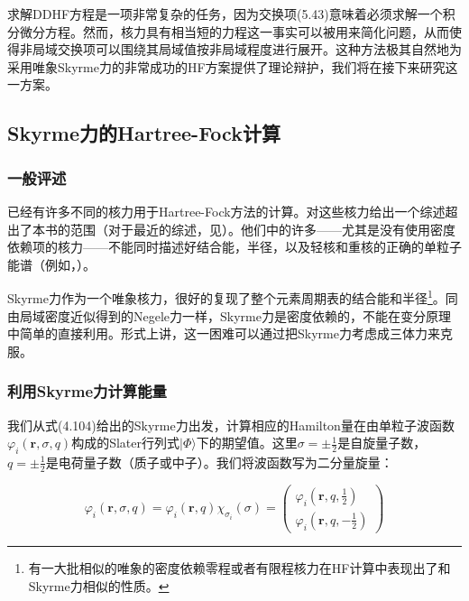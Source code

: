 求解DDHF方程是一项非常复杂的任务，因为交换项(5.43)意味着必须求解一个积分微分方程。然而，核力具有相当短的力程这一事实可以被用来简化问题，从而使得非局域交换项可以围绕其局域值按非局域程度进行展开。这种方法极其自然地为采用唯象Skyrme力的非常成功的HF方案提供了理论辩护，我们将在接下来研究这一方案\cite{Ne75}。

\subsection{Skyrme力的Hartree-Fock计算\label{subsec:Skyrme=00529B=007684Hartree-Fock=008BA1=007B97}}

\subsubsection{一般评述\label{subsubsec:=004E00=00822C=008BC4=008FF0}}

已经有许多不同的核力用于Hartree-Fock方法的计算。对这些核力给出一个综述超出了本书的范围（对于最近的综述，见\cite{QF78}）。他们中的许多——尤其是没有使用密度依赖项的核力——不能同时描述好结合能，半径，以及轻核和重核的正确的单粒子能谱（例如，\cite{Vo65,MB65,BB67,NDK68,PS68,SFW69,SP70}）。

Skyrme力作为一个唯象核力，很好的复现了整个元素周期表的结合能和半径\footnote{有一大批相似的唯象的密度依赖零程\cite{Mo70,LV71,La72,EM72,BJS75,Ko76,LB76,TK76,KKS77,SM78}或者有限程\cite{Kr70,ZR71,RPS72,LMV73,Go75b,RBP77}核力在HF计算中表现出了和Skyrme力相似的性质。}。同由局域密度近似得到的Negele力一样，Skyrme力是密度依赖的，不能在变分原理中简单的直接利用。形式上讲，这一困难可以通过把Skyrme力考虑成三体力来克服。

\subsubsection{利用Skyrme力计算能量\label{subsubsec:=005229=007528Skyrme=00529B=008BA1=007B97=0080FD=0091CF}}

我们从式(4.104)给出的Skyrme力出发，计算相应的Hamilton量在由单粒子波函数$\varphi_{i}(\boldsymbol{r},\sigma,q)$构成的Slater行列式$|\Phi\rangle$下的期望值。这里$\sigma=\pm\frac{1}{2}$是自旋量子数，$q=\pm\frac{1}{2}$是电荷量子数（质子或中子）。我们将波函数写为二分量旋量：

\begin{equation}
\varphi_{i}(\boldsymbol{r},\sigma,q)=\varphi_{i}(\boldsymbol{r},q)\chi_{\sigma_{i}}(\sigma)=\left(\begin{array}{c}
\varphi_{i}(\boldsymbol{r},q,\frac{1}{2})\\
\varphi_{i}(\boldsymbol{r},q,-\frac{1}{2})
\end{array}\right)\label{eq:skyrme_spinor}
\end{equation}

